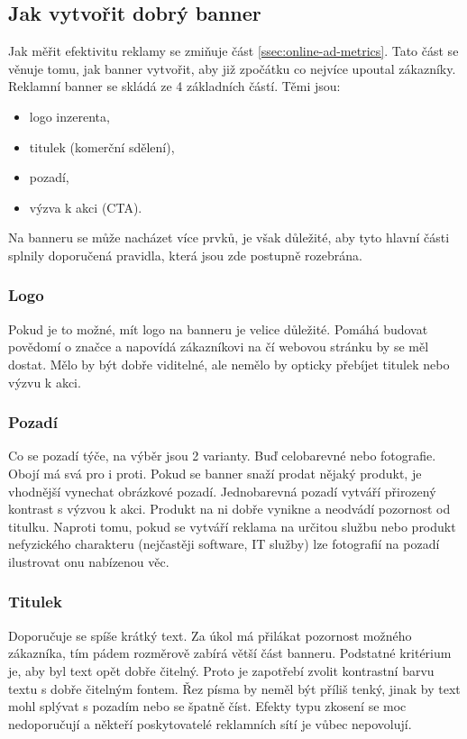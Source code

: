     \subsection{Jak vytvořit dobrý banner}
    Jak měřit efektivitu reklamy se zmiňuje část \ref{ssec:online-ad-metrics}. Tato část se věnuje tomu, jak banner vytvořit,
    aby již zpočátku co nejvíce upoutal zákazníky. \cite{banner:design}
    Reklamní banner se skládá ze 4 základních částí. Těmi jsou:
    \begin{itemize}
    \item logo inzerenta,
    \item titulek (komerční sdělení),
    \item pozadí,
    \item výzva k akci (CTA).
    \end{itemize}
    Na banneru se může nacházet více prvků, je však důležité, aby tyto hlavní části splnily doporučená pravidla, která jsou zde postupně rozebrána.

    \subsubsection{Logo}
    Pokud je to možné, mít logo na banneru je velice důležité. Pomáhá budovat povědomí o značce a napovídá zákazníkovi na čí webovou stránku by se měl dostat.
    Mělo by být dobře viditelné, ale nemělo by opticky přebíjet titulek nebo výzvu k akci.

    \subsubsection{Pozadí}
    Co se pozadí týče, na výběr jsou 2 varianty. Buď celobarevné nebo fotografie. Obojí má svá pro i proti. Pokud se banner snaží prodat nějaký produkt,
    je vhodnější vynechat obrázkové pozadí. Jednobarevná pozadí vytváří přirozený kontrast s výzvou k akci.
    Produkt na ni dobře vynikne a neodvádí pozornost od titulku. Naproti tomu, pokud se vytváří reklama na určitou službu nebo
    produkt nefyzického charakteru (nejčastěji software, IT služby) lze fotografií na pozadí ilustrovat onu nabízenou věc. 

    \subsubsection{Titulek}
    Doporučuje se spíše krátký text. Za úkol má přilákat pozornost možného zákazníka, tím pádem rozměrově zabírá větší část banneru.
    Podstatné kritérium je, aby byl text opět dobře čitelný. Proto je zapotřebí zvolit kontrastní barvu textu s dobře čitelným fontem.
    Řez písma by neměl být příliš tenký, jinak by text mohl splývat s pozadím nebo se špatně číst. Efekty typu zkosení se moc nedoporučují a
    někteří poskytovatelé reklamních sítí je vůbec nepovolují. 

